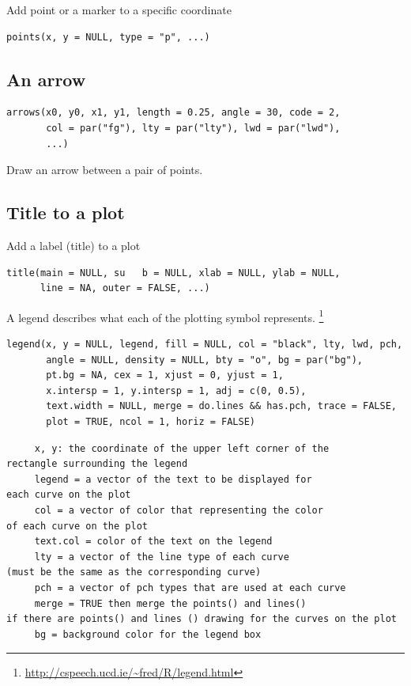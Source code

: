 Add point or a marker to a specific coordinate

\begin{lstlisting}
points(x, y = NULL, type = "p", ...)
\end{lstlisting}

\subsection{An arrow}
\label{sec:an-arrow}

\begin{lstlisting}
arrows(x0, y0, x1, y1, length = 0.25, angle = 30, code = 2,
       col = par("fg"), lty = par("lty"), lwd = par("lwd"),
       ...)
\end{lstlisting}
Draw an arrow between a pair of points.

\subsection{Title to a plot}
\label{sec:title-plot}

Add a label (title) to a plot
\begin{lstlisting}
title(main = NULL, su	b = NULL, xlab = NULL, ylab = NULL,
      line = NA, outer = FALSE, ...)
\end{lstlisting}

A legend describes what each of the plotting symbol represents.
\footnote{\url{http://cspeech.ucd.ie/~fred/R/legend.html}}
\begin{lstlisting}
legend(x, y = NULL, legend, fill = NULL, col = "black", lty, lwd, pch,
       angle = NULL, density = NULL, bty = "o", bg = par("bg"),
       pt.bg = NA, cex = 1, xjust = 0, yjust = 1,
       x.intersp = 1, y.intersp = 1, adj = c(0, 0.5),
       text.width = NULL, merge = do.lines && has.pch, trace = FALSE,
       plot = TRUE, ncol = 1, horiz = FALSE)
\end{lstlisting}
\begin{verbatim}
     x, y: the coordinate of the upper left corner of the 
rectangle surrounding the legend
     legend = a vector of the text to be displayed for 
each curve on the plot
     col = a vector of color that representing the color
of each curve on the plot 
     text.col = color of the text on the legend
     lty = a vector of the line type of each curve 
(must be the same as the corresponding curve)
     pch = a vector of pch types that are used at each curve
     merge = TRUE then merge the points() and lines() 
if there are points() and lines () drawing for the curves on the plot
     bg = background color for the legend box
\end{verbatim}

